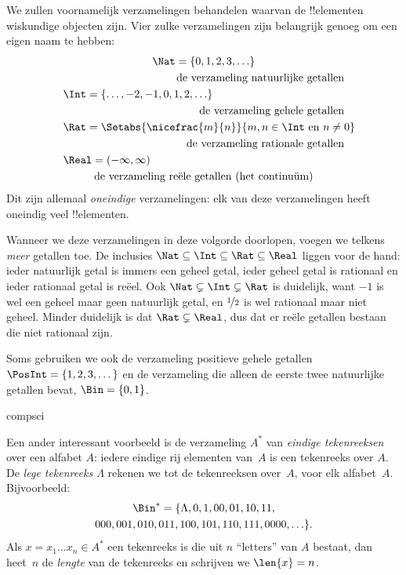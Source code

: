\documentclass[openany]{memoir}
\begin{document}
\begin{ex}
We zullen voornamelijk verzamelingen behandelen waarvan de !!{element}en
wiskundige objecten zijn. Vier zulke verzamelingen zijn belangrijk genoeg
om een eigen naam te hebben:
\begin{multline*}
    \Nat = \{0, 1, 2, 3, \ldots\} \\
    \shoveright{\text{de verzameling natuurlijke getallen}}\\
    \shoveleft{\Int = \{\ldots, -2, -1, 0, 1, 2, \ldots\}} \\
    \shoveright{\text{de verzameling gehele getallen}}\\
    \shoveleft{\Rat = \Setabs{\nicefrac{m}{n}}{m, n \in \Int\text{ en }n \neq 0}}\\
    \shoveright{\text{de verzameling rationale getallen}}\\
    \shoveleft{\Real = (-\infty, \infty)}\\
    \text{de verzameling reële getallen (het continuüm)}
\end{multline*}
Dit zijn allemaal \emph{oneindige} verzamelingen: elk van deze verzamelingen
heeft oneindig veel !!{element}en.

Wanneer we deze verzamelingen in deze volgorde doorlopen, voegen we telkens
\emph{meer} getallen toe. De inclusies $\Nat \subseteq \Int
\subseteq \Rat \subseteq \Real$ liggen voor de hand: ieder natuurlijk
getal is immers een geheel getal, ieder geheel getal is rationaal en ieder
rationaal getal is reëel. Ook $\Nat \subsetneq \Int \subsetneq
\Rat$ is duidelijk, want $-1$ is wel een geheel maar geen natuurlijk getal,
en $\nicefrac{1}{2}$ is wel rationaal maar niet geheel. Minder duidelijk is
dat $\Rat \subsetneq \Real$, dus dat er reële getallen bestaan die niet
rationaal zijn.

Soms gebruiken we ook de verzameling positieve gehele getallen $\PosInt = \{1,
2, 3, \dots\}$ en de verzameling die alleen de eerste twee natuurlijke
getallen bevat, $\Bin = \{0, 1\}$.
\end{ex}

\begin{tagblock}{compsci}
\begin{ex}[Tekenreeksen]
Een ander interessant voorbeeld is de verzameling $A^{*}$ van \emph{eindige
tekenreeksen} over een alfabet $A$: iedere eindige rij elementen van~$A$
is een tekenreeks over $A$. De \emph{lege tekenreeks $\Lambda$} rekenen we
tot de tekenreeksen over~$A$, voor elk alfabet~$A$. Bijvoorbeeld:
\begin{multline*}
\Bin^*
=\{\Lambda,0,1,00,01,10,11,\\
000,001,010,011,100,101,110,111,0000,\ldots\}.
\end{multline*}
Als $x=x_{1}\ldots x_{n}\in A^{*}$ een tekenreeks is die uit $n$
``letters'' van $A$ bestaat, dan heet~$n$ de \emph{lengte} van de tekenreeks
en schrijven we $\len{x}=n$.
\end{ex}
\end{tagblock}
\end{document}
